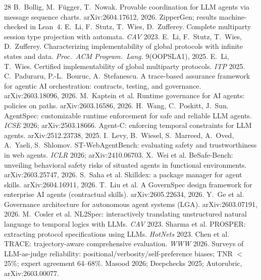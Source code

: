 \documentclass{article}
\begin{document}
\begin{thebibliography}{28}
 B.~Bollig, M.~F\"ugger, T.~Nowak. Provable coordination for LLM agents via message sequence charts. arXiv:2604.17612, 2026. ZipperGen; results machine-checked in Lean~4.
 E.~Li, F.~Stutz, T.~Wies, D.~Zufferey. Complete multiparty session type projection with automata. \emph{CAV} 2023.
 E.~Li, F.~Stutz, T.~Wies, D.~Zufferey. Characterizing implementability of global protocols with infinite states and data. \emph{Proc.\ ACM Program.\ Lang.} 9(OOPSLA1), 2025.
 E.~Li, T.~Wies. Certified implementability of global multiparty protocols. \emph{ITP} 2025.
 C.~Paduraru, P.-L.~Bouruc, A.~Stefanescu. A trace-based assurance framework for agentic AI orchestration: contracts, testing, and governance. arXiv:2603.18096, 2026.
 M.~Kaptein et al. Runtime governance for AI agents: policies on paths. arXiv:2603.16586, 2026.
 H.~Wang, C.~Poskitt, J.~Sun. AgentSpec: customizable runtime enforcement for safe and reliable LLM agents. \emph{ICSE} 2026; arXiv:2503.18666.
 Agent-C: enforcing temporal constraints for LLM agents. arXiv:2512.23738, 2025.
 I.~Levy, B.~Wiesel, S.~Marreed, A.~Oved, A.~Yaeli, S.~Shlomov. ST-WebAgentBench: evaluating safety and trustworthiness in web agents. \emph{ICLR} 2026; arXiv:2410.06703.
 X.~Wei et al. BeSafe-Bench: unveiling behavioral safety risks of situated agents in functional environments. arXiv:2603.25747, 2026.
 S.~Saha et al. Skilldex: a package manager for agent skills. arXiv:2604.16911, 2026.
 T.~Liu et al. A GovernSpec design framework for enterprise AI agents (contractual skills). arXiv:2605.22634, 2026.
 Y.~Ge et al. Governance architecture for autonomous agent systems (LGA). arXiv:2603.07191, 2026.
 M.~Cosler et al. NL2Spec: interactively translating unstructured natural language to temporal logics with LLMs. \emph{CAV} 2023.
 Sharma et al. PROSPER: extracting protocol specifications using LLMs. \emph{HotNets} 2023.
 Chen et al. TRACE: trajectory-aware comprehensive evaluation. \emph{WWW} 2026.
 Surveys of LLM-as-judge reliability: positional/verbosity/self-preference biases; TNR $<$25\%; expert agreement 64--68\%. Masood 2026; Deepchecks 2025; Autorubric, arXiv:2603.00077.

\end{thebibliography}
\end{document}
